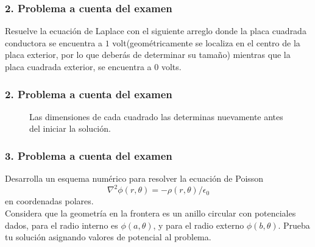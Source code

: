 \begin{frame}
\frametitle{2. Problema a cuenta del examen}
Resuelve la ecuación de Laplace con el siguiente arreglo donde la placa cuadrada conductora se encuentra a $1$ volt(geométricamente se localiza en el centro de la placa exterior, por lo que deberás de determinar su tamaño) mientras que la placa cuadrada exterior, se encuentra a $0$ volts.
\end{frame}
{
\begin{frame}
\frametitle{2. Problema a cuenta del examen}
\begin{figure}
	\centering
	
	\caption{Las dimensiones de cada cuadrado las determinas nuevamente antes del iniciar la solución.}
\end{figure}
\end{frame}
}
\begin{frame}
\frametitle{3. Problema a cuenta del examen}
Desarrolla un esquema numérico para resolver la ecuación de Poisson
\[ \nabla^{2} \phi (r,\theta) = - \rho (r, \theta) / \epsilon_{0} \]
en coordenadas polares. 
\\
\bigskip
Considera que la geometría en la frontera es un anillo circular con potenciales dados, para el radio interno es $\phi(a,\theta)$, y para el radio externo $\phi(b,\theta)$. Prueba tu solución asignando valores de potencial al problema.
\end{frame}
